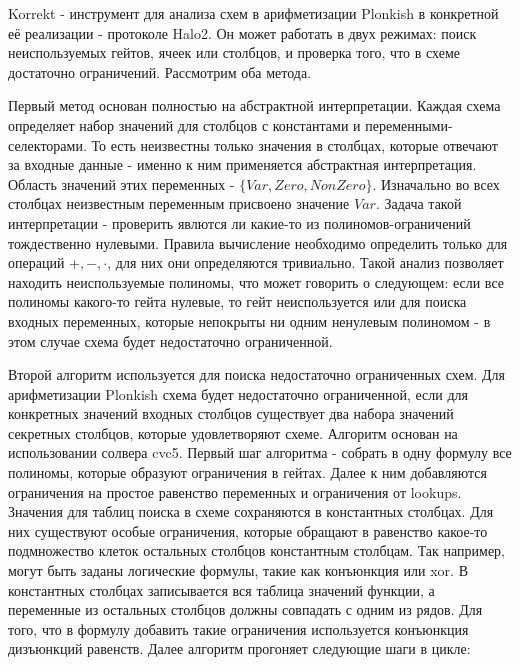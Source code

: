 \documentclass[a4paper]{article}
\begin{document}
Korrekt - инструмент для анализа схем в арифметизации Plonkish в конкретной её реализации - протоколе Halo2. Он может работать в двух режимах: поиск неиспользуемых гейтов, ячеек или столбцов, и проверка того, что в схеме достаточно ограничений. Рассмотрим оба метода.

Первый метод основан полностью на абстрактной интерпретации. Каждая схема определяет набор значений для столбцов с константами и переменными-селекторами. То есть неизвестны только значения в столбцах, которые отвечают за входные данные - именно к ним применяется абстрактная интерпретация. Область значений этих переменных - $\{Var, Zero, NonZero\}$. Изначально во всех столбцах неизвестным переменным присвоено значение $Var$. Задача такой интерпретации - проверить явлются ли какие-то из полиномов-ограничений тождественно нулевыми. Правила вычисление необходимо определить только для операций $+, -, \cdot$, для них они определяются тривиально. Такой анализ позволяет находить неиспользуемые полиномы, что может говорить о следующем: если все полиномы какого-то гейта нулевые, то гейт неиспользуется или для поиска входных переменных, которые непокрыты ни одним ненулевым полиномом - в этом случае схема будет недостаточно ограниченной.

Второй алгоритм используется для поиска недостаточно ограниченных схем. Для арифметизации Plonkish схема будет недостаточно ограниченной, если для конкретных значений входных столбцов существует два набора значений секретных столбцов, которые удовлетворяют схеме. Алгоритм основан на использовании солвера cvc5. Первый шаг алгоритма - собрать в одну формулу все полиномы, которые образуют ограничения в гейтах. Далее к ним добавляются ограничения на простое равенство переменных и ограничения от lookups. Значения для таблиц поиска в схеме сохраняются в константных столбцах. Для них существуют особые ограничения, которые обращают в равенство какое-то подмножество клеток остальных столбцов константным столбцам. Так например, могут быть заданы логические формулы, такие как конъюнкция или xor. В константных столбцах записывается вся таблица значений функции, а переменные из остальных столбцов должны совпадать с одним из рядов. Для того, что в формулу добавить такие ограничения используется конъюнкция дизъюнкций равенств. Далее алгоритм прогоняет следующие шаги в цикле:
\end{document}
